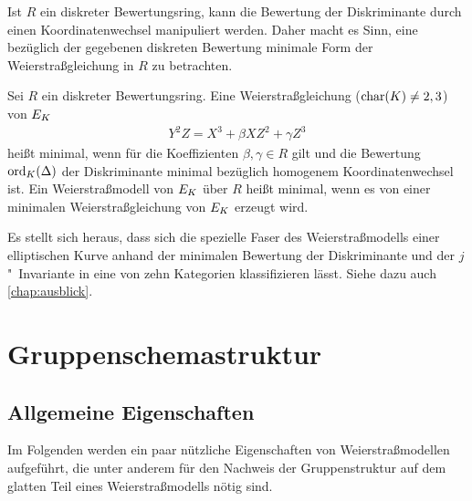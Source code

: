 Ist $R$ ein diskreter Bewertungsring, kann die Bewertung der
Diskriminante durch einen Koordinatenwechsel manipuliert werden. Daher
macht es Sinn, eine bezüglich der gegebenen diskreten Bewertung minimale
Form der Weierstraßgleichung in $R$ zu betrachten.
\begin{Definition}
  Sei $R$ ein diskreter Bewertungsring.
  Eine Weierstraßgleichung ($\operatorname{char}(K)\neq2,3$) von $E_{K}$
  \begin{gather*}
    Y^2Z = X^3 + \beta XZ^2 + \gamma Z^3
  \end{gather*}
  heißt minimal, wenn für die Koeffizienten ${\beta, \gamma\in R}$ gilt
  und die Bewertung $\operatorname{ord}_{K}(\Delta)$ der Diskriminante minimal
  bezüglich homogenem Koordinatenwechsel ist.
  Ein Weierstraßmodell von $E_{K}$ über $R$ heißt minimal,
  wenn es von einer minimalen Weierstraßgleichung von $E_{K}$ erzeugt
  wird.
\end{Definition}
Es stellt sich heraus, dass sich die spezielle Faser des
Weierstraßmodells einer elliptischen Kurve anhand der minimalen
Bewertung der Diskriminante und der $j$"~Invariante in eine von zehn
Kategorien klassifizieren lässt. Siehe dazu auch \autoref{chap:ausblick}. 


\section{Gruppenschemastruktur}\label{chap:weierstraßgruppe}
\subsection{Allgemeine Eigenschaften}
Im Folgenden werden ein paar nützliche Eigenschaften von
Weierstraßmodellen aufgeführt, die unter anderem für den Nachweis der
Gruppenstruktur auf dem glatten Teil eines Weierstraßmodells nötig
sind.

